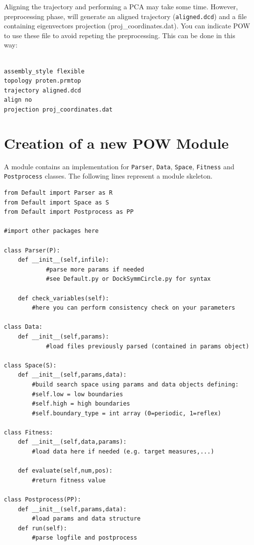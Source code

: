 \documentclass[a4paper, 12pt]{article}
\begin{document}
Aligning the trajectory and performing a PCA may take some time. However, preprocessing phase, will generate an aligned trajectory (\texttt{aligned.dcd}) and a file containing eigenvectors projection (proj\_coordinates.dat). You can indicate POW to use these file to avoid repeting the preprocessing. This can be done in this way:

\begin{verbatim}

assembly_style flexible
topology proten.prmtop
trajectory aligned.dcd
align no
projection proj_coordinates.dat

\end{verbatim}


\section{Creation of a new POW Module}

A module contains an implementation for \texttt{Parser}, \texttt{Data}, \texttt{Space}, \texttt{Fitness} and \texttt{Postprocess} classes. The following lines represent a module skeleton.\\

\begin{verbatim}
from Default import Parser as R
from Default import Space as S
from Default import Postprocess as PP

#import other packages here

class Parser(P):
  	def __init__(self,infile):
		    #parse more params if needed
		    #see Default.py or DockSymmCircle.py for syntax

    def check_variables(self):
        #here you can perform consistency check on your parameters

class Data:
    def __init__(self,params):
		    #load files previously parsed (contained in params object)
		    
class Space(S):
    def __init__(self,params,data):
        #build search space using params and data objects defining:
        #self.low = low boundaries
        #self.high = high boundaries
        #self.boundary_type = int array (0=periodic, 1=reflex)

class Fitness:
    def __init__(self,data,params):
        #load data here if needed (e.g. target measures,...)
    
    def evaluate(self,num,pos):
        #return fitness value

class Postprocess(PP):
    def __init__(self,params,data):
        #load params and data structure
    def run(self):
        #parse logfile and postprocess
        
\end{verbatim}
\end{document}
